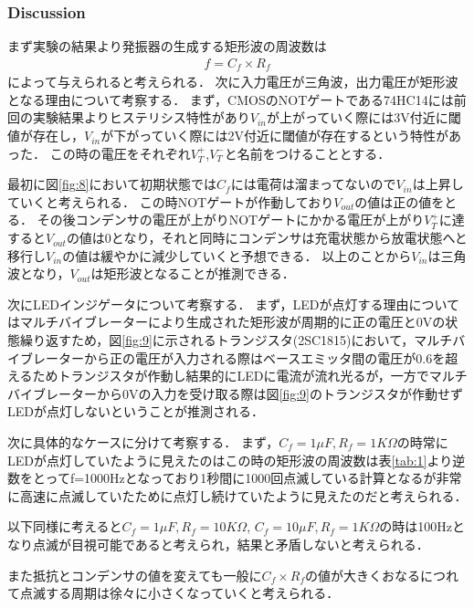 \documentclass[11pt, a4paper,twocolumn]{jarticle}
\begin{document}
\subsubsection{Discussion}
まず実験の結果より発振器の生成する矩形波の周波数は
\begin{eqnarray}
    f=C_f\times R_f \nonumber
\end{eqnarray}
によって与えられると考えられる．
次に入力電圧が三角波，出力電圧が矩形波となる理由について考察する．
まず，CMOSのNOTゲートである74HC14には前回の実験結果よりヒステリシス特性があり$V_{in}$が上がっていく際には3V付近に閾値が存在し，$V_{in}$が下がっていく際には2V付近に閾値が存在するという特性があった．
この時の電圧をそれぞれ$V_T^+$,$V_T^-$と名前をつけることとする．

最初に図\ref{fig:8}において初期状態では$C_f$には電荷は溜まってないので$V_{in}$は上昇していくと考えられる．
この時NOTゲートが作動しており$V_{out}$の値は正の値をとる．
その後コンデンサの電圧が上がりNOTゲートにかかる電圧が上がり$V_T^+$に達すると$V_{out}$の値は0となり，それと同時にコンデンサは充電状態から放電状態へと移行し$V_{in}$の値は緩やかに減少していくと予想できる．
以上のことから$V_{in}$は三角波となり，$V_{out}$は矩形波となることが推測できる．

次にLEDインジゲータについて考察する．
まず，LEDが点灯する理由についてはマルチバイブレーターにより生成された矩形波が周期的に正の電圧と0Vの状態繰り返すため，図\ref{fig:9}に示されるトランジスタ(2SC1815)において，マルチバイブレーターから正の電圧が入力される際はベースエミッタ間の電圧が0.6を超えるためトランジスタが作動し結果的にLEDに電流が流れ光るが，一方でマルチバイブレーターから0Vの入力を受け取る際は図\ref{fig:9}のトランジスタが作動せずLEDが点灯しないということが推測される．

次に具体的なケースに分けて考察する．
まず，$C_f=1\mu F,R_f=1K\Omega$の時常にLEDが点灯していたように見えたのはこの時の矩形波の周波数は表\ref{tab:1}より逆数をとってf=1000Hzとなっており1秒間に1000回点滅している計算となるが非常に高速に点滅していたために点灯し続けていたように見えたのだと考えられる．

以下同様に考えると$C_f=1\mu F,R_f=10K\Omega$,
$C_f=10\mu F,R_f=1K\Omega$の時は100Hzとなり点滅が目視可能であると考えられ，結果と矛盾しないと考えられる．

また抵抗とコンデンサの値を変えても一般に$C_f \times R_f$の値が大きくおなるにつれて点滅する周期は徐々に小さくなっていくと考えられる．
\newpage
\end{document}
